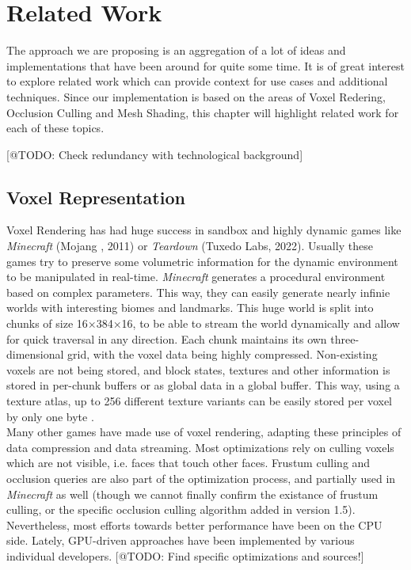 \chapter{Related Work} \label{cpt-related-work}

The approach we are proposing is an aggregation of a lot of ideas and implementations that have been 
around for quite some time. It is of great interest to explore related work which can provide 
context for use cases and additional techniques. Since our implementation is based on the areas 
of Voxel Redering, Occlusion Culling and Mesh Shading, this chapter will highlight related work 
for each of these topics. 


[@TODO: Check redundancy with technological background]

\section{Voxel Representation}

Voxel Rendering has had huge success in sandbox and highly dynamic games like \emph{Minecraft} (Mojang \cite{Mojang2024}, 2011) 
or \emph{Teardown} (Tuxedo Labs, 2022). Usually these games try to preserve some volumetric information for the 
dynamic environment to be manipulated in real-time. \emph{Minecraft} generates a procedural environment based on 
complex parameters. This way, they can easily generate nearly infinie worlds with interesting biomes and 
landmarks. This huge world is split into chunks of size 16×384×16, to be able to stream the world dynamically and 
allow for quick traversal in any direction. Each chunk maintains its own three-dimensional grid, with the voxel 
data being highly compressed. Non-existing voxels are not being stored, and block states, textures and other 
information is stored in per-chunk buffers or as global data in a global buffer. This way, using a texture atlas, 
up to 256 different texture variants can be easily stored per voxel by only one byte 
\cite{Bergensten2012, MinecraftFandom2021}. \\

\noindent
Many other games have made use of voxel rendering, adapting these principles of data compression and data streaming. 
Most optimizations rely on culling voxels which are not visible, i.e. faces that touch other faces.
Frustum culling and occlusion queries are also part of the optimization process, and partially used in \emph{Minecraft} 
as well (though we cannot finally confirm the existance of frustum culling, or the specific occlusion culling 
algorithm added in version 1.5). Nevertheless, most efforts towards better performance have been on the \ac{CPU} side.
Lately, \ac{GPU}-driven approaches have been implemented by various individual developers. [@TODO: Find specific 
optimizations and sources!]  \\


